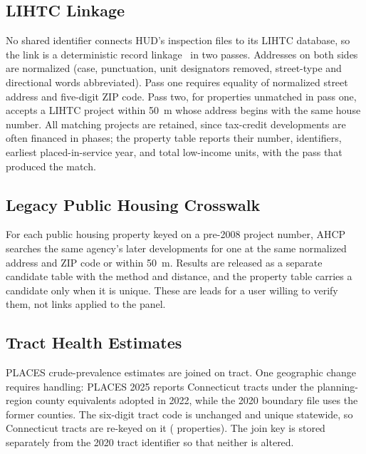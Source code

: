 \documentclass[10pt,twocolumn,letterpaper]{article}
\begin{document}
\subsection{LIHTC Linkage}\label{sec:lihtc}
No shared identifier connects HUD's inspection files to its LIHTC database, so the link is a deterministic record linkage~\cite{fellegi1969,christen2012} in two passes. Addresses on both sides are normalized (case, punctuation, unit designators removed, street-type and directional words abbreviated). Pass one requires equality of normalized street address and five-digit ZIP code. Pass two, for properties unmatched in pass one, accepts a LIHTC project within 50~m whose address begins with the same house number. All matching projects are retained, since tax-credit developments are often financed in phases; the property table reports their number, identifiers, earliest placed-in-service year, and total low-income units, with the pass that produced the match.

\subsection{Legacy Public Housing Crosswalk}\label{sec:legacy}
For each public housing property keyed on a pre-2008 project number, AHCP searches the same agency's later developments for one at the same normalized address and ZIP code or within 50~m. Results are released as a separate candidate table with the method and distance, and the property table carries a candidate only when it is unique. These are leads for a user willing to verify them, not links applied to the panel.

\subsection{Tract Health Estimates}
PLACES crude-prevalence estimates are joined on tract. One geographic change requires handling: PLACES 2025 reports Connecticut tracts under the planning-region county equivalents adopted in 2022, while the 2020 boundary file uses the former counties. The six-digit tract code is unchanged and unique statewide, so Connecticut tracts are re-keyed on it (\placesCT{} properties). The join key is stored separately from the 2020 tract identifier so that neither is altered.
\end{document}
